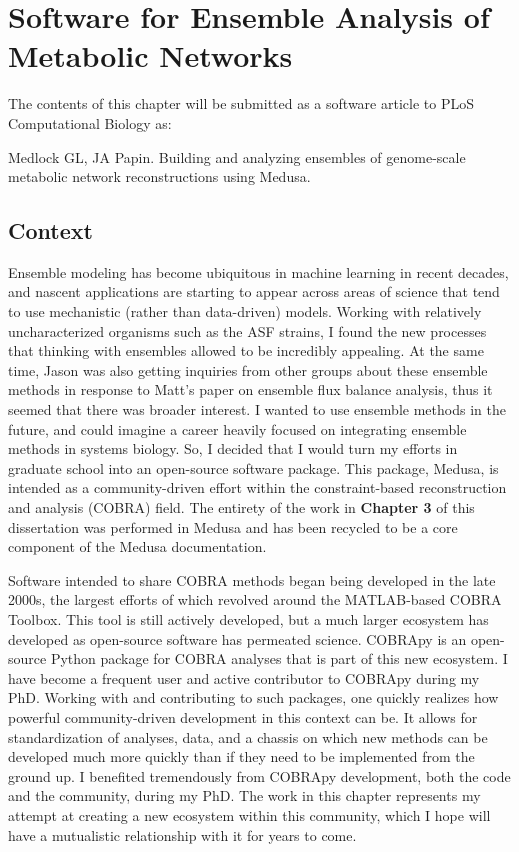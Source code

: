 \documentclass[11pt,onecolumn,notitlepage,openany,twoside]{book}
\begin{document}
\chapter{Software for Ensemble Analysis of Metabolic Networks}
\begin{refsection}

The contents of this chapter will be submitted as a software article to PLoS Computational Biology as:

\medskip\noindent
Medlock GL, JA Papin. Building and analyzing ensembles of genome-scale metabolic network reconstructions using Medusa.

\section{Context}

Ensemble modeling has become ubiquitous in machine learning in recent decades, and nascent applications are starting to appear across areas of science that tend to use mechanistic (rather than data-driven) models. Working with relatively uncharacterized organisms such as the ASF strains, I found the new processes that thinking with ensembles allowed to be incredibly appealing. At the same time, Jason was also getting inquiries from other groups about these ensemble methods in response to Matt's paper on ensemble flux balance analysis, thus it seemed that there was broader interest. I wanted to use ensemble methods in the future, and could imagine a career heavily focused on integrating ensemble methods in systems biology. So, I decided that I would turn my efforts in graduate school into an open-source software package. This package, Medusa, is intended as a community-driven effort within the constraint-based reconstruction and analysis (COBRA) field. The entirety of the work in \textbf{Chapter 3} of this dissertation was performed in Medusa and has been recycled to be a core component of the Medusa documentation.

Software intended to share COBRA methods began being developed in the late 2000s, the largest efforts of which revolved around the MATLAB-based COBRA Toolbox. This tool is still actively developed, but a much larger ecosystem has developed as open-source software has permeated science. COBRApy is an open-source Python package for COBRA analyses that is part of this new ecosystem. I have become a frequent user and active contributor to COBRApy during my PhD. Working with and contributing to such packages, one quickly realizes how powerful community-driven development in this context can be. It allows for standardization of analyses, data, and a chassis on which new methods can be developed much more quickly than if they need to be implemented from the ground up. I benefited tremendously from COBRApy development, both the code and the community, during my PhD. The work in this chapter represents my attempt at creating a new ecosystem within this community, which I hope will have a mutualistic relationship with it for years to come.


\end{refsection}
\end{document}
